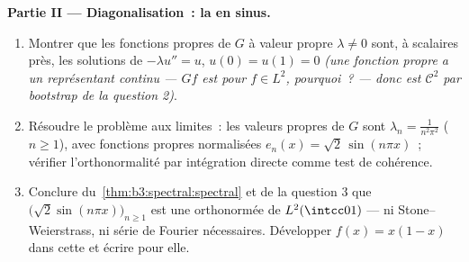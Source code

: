\begin{problem}
\medskip
\noindent\textbf{Partie II --- Diagonalisation~: la  en
sinus.}
\begin{enumerate}[resume]
  \item Montrer que les fonctions propres de $G$ à valeur
        propre $\lambda \ne 0$ sont, à scalaires près, les
        solutions de $-\lambda u'' = u$, $u(0) = u(1) = 0$
        \emph{(une fonction propre a un représentant continu
        --- $Gf$ est  pour $f \in L^2$, pourquoi~?
        --- donc est $\mathcal C^2$ par bootstrap de la
        question 2)}.
  \item Résoudre le problème aux limites~: les valeurs
        propres de $G$ sont $\lambda_n = \frac1{n^2\pi^2}$
        ($n \geq 1$), avec fonctions propres normalisées
        $e_n(x) = \sqrt2\,\sin(n\pi x)$~; vérifier
        l'orthonormalité par intégration directe comme test
        de cohérence.
  \item Conclure du~\cref{thm:b3:spectral:spectral} et de la
        question 3 que
        $\bigl(\sqrt2\sin(n\pi x)\bigr)_{n\geq1}$ est une
        \emph{} orthonormée de $L^2(\intcc01)$ --- ni
        Stone--Weierstrass, ni série de Fourier nécessaires.
        Développer $f(x) = x(1-x)$ dans cette  et écrire
         pour elle.
\end{enumerate}


\end{problem}
